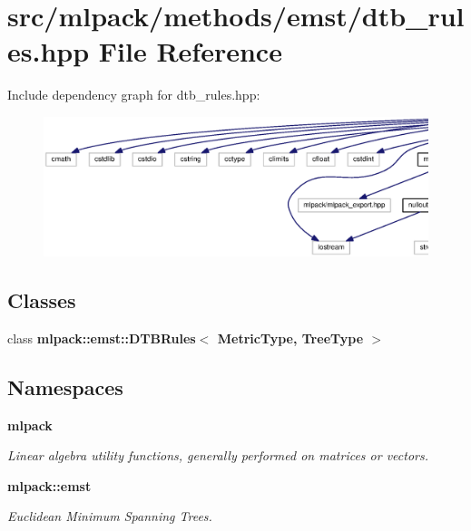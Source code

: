 \section{src/mlpack/methods/emst/dtb\+\_\+rules.hpp File Reference}
\label{dtb__rules_8hpp}
Include dependency graph for dtb\+\_\+rules.\+hpp\+:
\nopagebreak
\begin{figure}[H]
\begin{center}
\leavevmode
\includegraphics[width=350pt]{dtb__rules_8hpp__incl}
\end{center}
\end{figure}
\subsection*{Classes}
\begin{DoxyCompactItemize}
\item 
class {\bf mlpack\+::emst\+::\+D\+T\+B\+Rules$<$ Metric\+Type, Tree\+Type $>$}
\end{DoxyCompactItemize}
\subsection*{Namespaces}
\begin{DoxyCompactItemize}
\item 
 {\bf mlpack}
\begin{DoxyCompactList}\small\item\em Linear algebra utility functions, generally performed on matrices or vectors. \end{DoxyCompactList}\item 
 {\bf mlpack\+::emst}
\begin{DoxyCompactList}\small\item\em Euclidean Minimum Spanning Trees. \end{DoxyCompactList}\end{DoxyCompactItemize}
